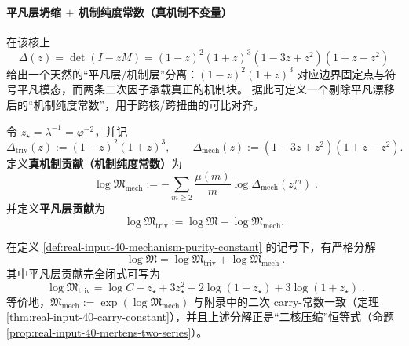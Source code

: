 \paragraph{平凡层坍缩 \texorpdfstring{$+$}{+} 机制纯度常数（真机制不变量）}
在该核上
\[
\Delta(z)=\det(I-zM)=(1-z)^2(1+z)^3(1-3z+z^2)(1+z-z^2)
\]
给出一个天然的“平凡层/机制层”分离：\((1-z)^2(1+z)^3\) 对应边界固定点与符号平凡模态，而两条二次因子承载真正的机制块。
据此可定义一个剔除平凡漂移后的“机制纯度常数”，用于跨核/跨扭曲的可比对齐。

\begin{definition}\label{def:real-input-40-mechanism-purity-constant}
令 \(z_\star=\lambda^{-1}=\varphi^{-2}\)，并记
\[
\Delta_{\mathrm{triv}}(z):=(1-z)^2(1+z)^3,\qquad
\Delta_{\mathrm{mech}}(z):=(1-3z+z^2)(1+z-z^2).
\]
定义\textbf{真机制贡献（机制纯度常数）}为
\[
\boxed{\;
\log\mathfrak{M}_{\mathrm{mech}}
:=
-\sum_{m\ge 2}\frac{\mu(m)}{m}\log \Delta_{\mathrm{mech}}(z_\star^{\,m})
\; }.
\]
并定义\textbf{平凡层贡献}为
\[
\boxed{\;
\log\mathfrak{M}_{\mathrm{triv}}
:=\log\mathfrak{M}-\log\mathfrak{M}_{\mathrm{mech}}.\;}
\]
\end{definition}

\begin{proposition}[平凡层显式坍缩与二核机制常数]\label{prop:real-input-40-triv-mech-split}
在定义 \ref{def:real-input-40-mechanism-purity-constant} 的记号下，有严格分解
\[
\boxed{\ \log\mathfrak{M}=\log\mathfrak{M}_{\mathrm{triv}}+\log\mathfrak{M}_{\mathrm{mech}}\ }.
\]
其中平凡层贡献完全闭式可写为
\[
\boxed{\;
\log\mathfrak{M}_{\mathrm{triv}}
=\log C-z_\star+3z_\star^2+2\log(1-z_\star)+3\log(1+z_\star)\; }.
\]
等价地，\(\mathfrak{M}_{\mathrm{mech}}:=\exp(\log\mathfrak{M}_{\mathrm{mech}})\) 与附录中的二次 carry-常数一致（定理 \ref{thm:real-input-40-carry-constant}），并且上述分解正是“二核压缩”恒等式（命题 \ref{prop:real-input-40-mertens-two-series}）。
\end{proposition}

